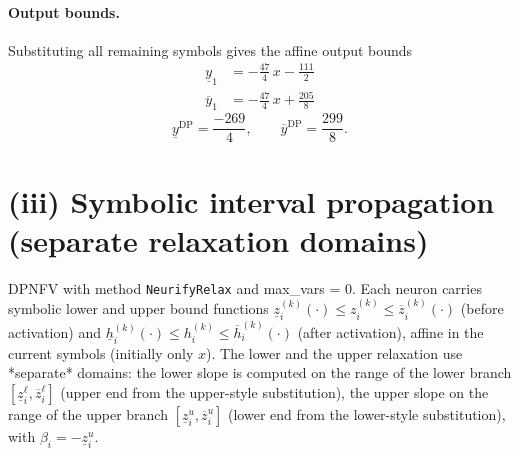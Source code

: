 \documentclass[11pt]{article}
\begin{document}
\paragraph{Output bounds.}
Substituting all remaining symbols gives the affine output bounds
\begin{align*}
\underline{y}_{1} &= -\frac{47}{4}\,x - \frac{111}{2}
\end{align*}
\begin{align*}
\overline{y}_{1} &= -\frac{47}{4}\,x + \frac{205}{8}
\end{align*}
\begin{equation*}
\underline{y}^{\text{DP}} = \frac{-269}{4}, \qquad \overline{y}^{\text{DP}} = \frac{299}{8}.
\end{equation*}

\section{(iii) Symbolic interval propagation (separate relaxation domains)}
DPNFV with method \texttt{NeurifyRelax} and max\_vars = 0. Each neuron carries symbolic lower and upper bound functions
$\underline{z}^{(k)}_i(\cdot) \le z^{(k)}_i \le \overline{z}^{(k)}_i(\cdot)$ (before activation)
and $\underline{h}^{(k)}_i(\cdot) \le h^{(k)}_i \le \overline{h}^{(k)}_i(\cdot)$ (after activation),
affine in the current symbols (initially only $x$).
The lower and the upper relaxation use *separate* domains:
the lower slope is computed on the range of the lower branch
$[\underline{z}^{\ell}_i, \overline{z}^{\ell}_i]$ (upper end from the upper-style substitution),
the upper slope on the range of the upper branch
$[\underline{z}^{u}_i, \overline{z}^{u}_i]$ (lower end from the lower-style substitution),
with $\beta_i = -\underline{z}^{u}_i$.
\end{document}

